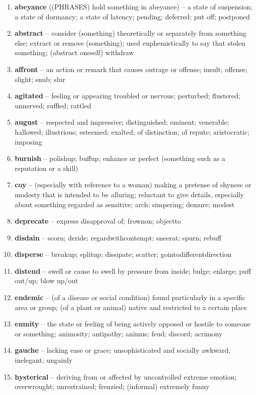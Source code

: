 \begin{enumerate}[wide,labelindent=0pt]
\item \textbf{abeyance} ((PHRASES) hold something in abeyance) -- a state of suspension;  a state of dormancy; a state of latency; pending; deferred; put off;  postponed
\item \textbf{abstract} -- consider (something) theoretically or separately from something else; extract or remove (something); used euphemistically to say that stolen something;  (abstract oneself) withdraw
\item \textbf{affront} -- an action or remark that causes outrage or offense; insult; offense; slight; snub; slur
\item \textbf{agitated} -- feeling or appearing troubled or nervous; perturbed; flustered; unnerved; ruffled; rattled
\item \textbf{august} -- respected and impressive;  distinguished; eminent; venerable; hallowed; illustrious; esteemed; exalted; of distinction; of repute;  aristocratic;  imposing
\item \textbf{burnish} -- polishup; buffup; enhance or perfect (something such as a reputation or a skill)
\item \textbf{coy} -- (especially with reference to a woman) making a pretense of shyness or modesty that is intended to be alluring; reluctant to give details, especially about something regarded as sensitive; arch; simpering; demure; modest
\item \textbf{deprecate} -- express disapproval of; frownon; objectto
\item \textbf{disdain} -- scorn;  deride; regardwithcontempt; sneerat; spurn; rebuff
\item \textbf{disperse} -- breakup; splitup; dissipate; scatter; gointodifferentdirection
\item \textbf{distend} -- swell or cause to swell by pressure from inside; bulge; enlarge; puff out/up; blow up/out
\item \textbf{endemic} -- (of a disease or social condition) found particularly in a specific area or group;  (of a plant or animal) native and restricted to a certain place
\item \textbf{enmity} -- the state or feeling of being actively opposed or hostile to someone or something;  animosity; antipathy; animus; feud; discord;  acrimony
\item \textbf{gauche} -- lacking ease or grace; unsophisticated and socially awkward; inelegant; ungainly
\item \textbf{hysterical} -- deriving from or affected by uncontrolled extreme emotion; overwrought; unrestrained; frenzied; (informal) extremely funny

\end{enumerate}
